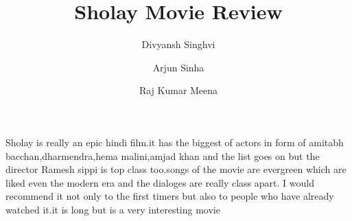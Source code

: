 \documentclass[]{article}
\title{Sholay Movie Review}
\author{Divyansh Singhvi
	\and
	Arjun Sinha
	\and
	Raj Kumar Meena}
\begin{document}
\maketitle
Sholay is really an epic hindi film.it has the biggest of actors in form of amitabh bacchan,dharmendra,hema malini,amjad khan and the list goes on but the director Ramesh sippi is top class too.songs of the movie are evergreen which are liked even the modern era and the dialoges are really class apart.
I would recommend it not only to the first timers but also to people who have already watched it.it is long but is a very interesting movie
\end{document}
